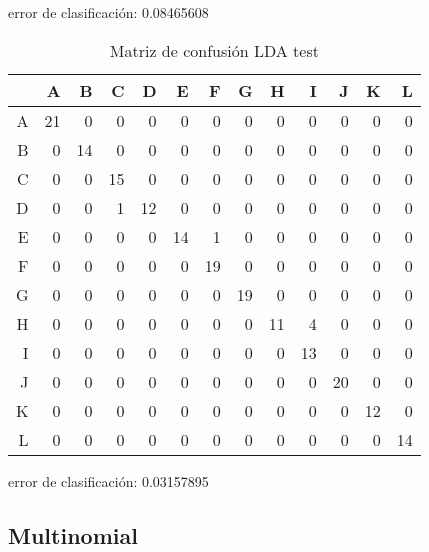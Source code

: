 error de clasificación:  0.08465608
 
 \restoregeometry 
 \begin{table}[ht]
\centering
\begin{tabular}{rrrrrrrrrrrrr}
  \hline
 & A & B & C & D & E & F & G & H & I & J & K & L \\ 
  \hline
A &  21 &   0 &   0 &   0 &   0 &   0 &   0 &   0 &   0 &   0 &   0 &   0 \\ 
  B &   0 &  14 &   0 &   0 &   0 &   0 &   0 &   0 &   0 &   0 &   0 &   0 \\ 
  C &   0 &   0 &  15 &   0 &   0 &   0 &   0 &   0 &   0 &   0 &   0 &   0 \\ 
  D &   0 &   0 &   1 &  12 &   0 &   0 &   0 &   0 &   0 &   0 &   0 &   0 \\ 
  E &   0 &   0 &   0 &   0 &  14 &   1 &   0 &   0 &   0 &   0 &   0 &   0 \\ 
  F &   0 &   0 &   0 &   0 &   0 &  19 &   0 &   0 &   0 &   0 &   0 &   0 \\ 
  G &   0 &   0 &   0 &   0 &   0 &   0 &  19 &   0 &   0 &   0 &   0 &   0 \\ 
  H &   0 &   0 &   0 &   0 &   0 &   0 &   0 &  11 &   4 &   0 &   0 &   0 \\ 
  I &   0 &   0 &   0 &   0 &   0 &   0 &   0 &   0 &  13 &   0 &   0 &   0 \\ 
  J &   0 &   0 &   0 &   0 &   0 &   0 &   0 &   0 &   0 &  20 &   0 &   0 \\ 
  K &   0 &   0 &   0 &   0 &   0 &   0 &   0 &   0 &   0 &   0 &  12 &   0 \\ 
  L &   0 &   0 &   0 &   0 &   0 &   0 &   0 &   0 &   0 &   0 &   0 &  14 \\ 
   \hline
\end{tabular}
	\label{tabla:confusionLDAtest}
	\caption{Matriz de confusión LDA test}
\end{table}


error de clasificación: 0.03157895
\restoregeometry 

\subsection{Multinomial}


